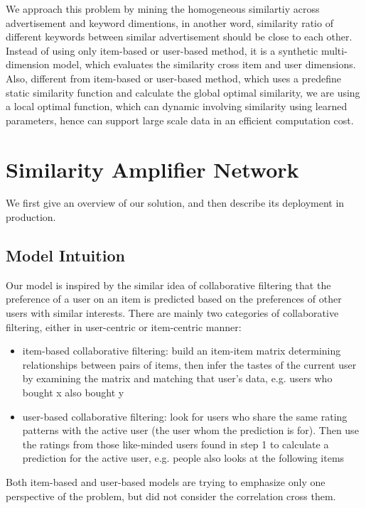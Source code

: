 \documentclass[conference,compsoc]{IEEEtran}
\begin{document}
We approach this problem by mining the homogeneous similartiy across advertisement and keyword dimentions, in another word,  similarity ratio of different keywords between similar advertisement should be close to each other.  Instead of using only item-based or user-based method, it is a synthetic multi-dimension model, which evaluates the similarity cross item and user dimensions. Also, different from item-based or user-based method, which uses a predefine static similarity function and calculate the global optimal similarity,  we are using a local optimal function, which can  dynamic involving similarity using learned parameters, hence can support large scale data in an efficient computation cost.  




%
\section{Similarity Amplifier Network }
\label{sec:model}

We first give an overview of our solution, and then describe its deployment in production. 


\subsection{Model Intuition} 
\label{sec:model_intuition}

Our model is inspired by the similar idea of collaborative filtering that the preference of a user on an item is predicted based on the preferences of other users with similar interests.  There are mainly two categories of collaborative filtering, either in user-centric or item-centric manner: 
\begin{itemize}
\item item-based collaborative filtering:   build an item-item matrix determining relationships between pairs of items, then infer the tastes of the current user by examining the matrix and matching that user's data, e.g. users who bought x also bought y 
\item user-based collaborative filtering: look for users who share the same rating patterns with the active user (the user whom the prediction is for). Then use the ratings from those like-minded users found in step 1 to calculate a prediction for the active user, e.g. people also looks at the following items
\end{itemize}
Both item-based and user-based models are trying to emphasize only one perspective of the problem, but did not consider the correlation cross them. 
\end{document}
